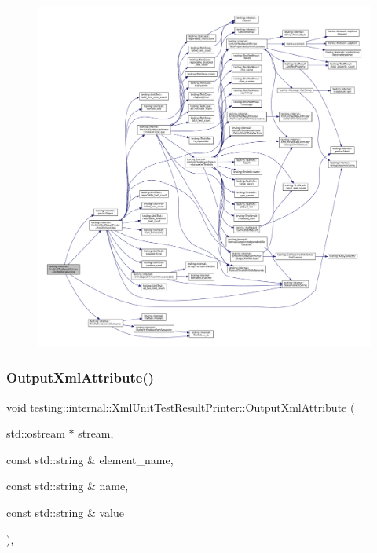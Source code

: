 \begin{figure}[H]
\begin{center}
\leavevmode
\includegraphics[width=350pt]{classtesting_1_1internal_1_1XmlUnitTestResultPrinter_a2ae986dd2f4f2aed31cc6f3bc8c56898_cgraph}
\end{center}
\end{figure}
\mbox{\label{classtesting_1_1internal_1_1XmlUnitTestResultPrinter_aa8ca7066de948d26d171597430c75839}} 
\subsubsection{\texorpdfstring{Output\+Xml\+Attribute()}{OutputXmlAttribute()}}
{\footnotesize\ttfamily void testing\+::internal\+::\+Xml\+Unit\+Test\+Result\+Printer\+::\+Output\+Xml\+Attribute (\begin{DoxyParamCaption}\item[{std\+::ostream $\ast$}]{stream,  }\item[{const std\+::string \&}]{element\+\_\+name,  }\item[{const std\+::string \&}]{name,  }\item[{const std\+::string \&}]{value }\end{DoxyParamCaption})\hspace{0.3cm}{\ttfamily [static]}, {\ttfamily [private]}}




